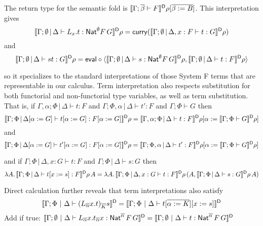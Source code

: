 \documentclass{lmcs}
\theoremstyle{plain}\newtheorem{satz}[thm]{Satz}
\begin{document}
{The return type for the semantic fold is
  $\llbracket{\Gamma;\overline{\beta} \vdash F}\rrbracket^{\mathsf D}\rho[\overline{\beta := B}]$.
This interpretation gives
\[\dsem{\Gamma;\emptyset \,|\, \Delta
  \vdash L_\empty x. t : \Nat^\emptyset F\, G}\rho = \curry
  (\dsem{\Gamma;\emptyset \,|\, \Delta, x : F \vdash t :
  G}\rho)\]
and
\[\llbracket{\Gamma;\emptyset \,|\, \Delta \vdash st:
    G}\rrbracket^{\mathsf D} \rho = \mathsf{eval} \circ \langle \llbracket{\Gamma;\emptyset \,|\, \Delta
  \vdash s: \mathsf{Nat}^\emptyset F\, G}\rrbracket^{\mathsf D}\rho, \llbracket{\Gamma;\emptyset \,|\, \Delta \vdash
  t: F}\rrbracket^{\mathsf D}\rho \rangle\]

\vspace*{0.05in}

\noindent
so it specializes to the standard interpretations of those System F
terms that are representable in our calculus.  Term interpretation
also respects substitution for both functorial and non-functorial type
variables, as well as term substitution. That is, if
$\Gamma,\alpha;\Phi \,|\, \Delta \vdash t : F$ and $\Gamma;\Phi,\alpha
\,|\, \Delta \vdash t' : F$ and $\Gamma;\Phi \vdash G$ then
\[\llbracket{\Gamma;\Phi \,|\, \Delta[\alpha := G] \vdash t[\alpha :=
    G] : F[\alpha := G]}\rrbracket^{\mathsf D}\rho = \llbracket{\Gamma,\alpha;\Phi \,|\, \Delta
  \vdash t : F }\rrbracket^{\mathsf D}\rho [ \alpha := \llbracket{\Gamma;\Phi\vdash G}\rrbracket^{\mathsf D}\rho ]\]
and
\[\llbracket{\Gamma;\Phi \,|\, \Delta[\alpha := G] \vdash t'[\alpha :=
    G] : F[\alpha := G]}\rrbracket^{\mathsf D}\rho = \llbracket{\Gamma;\Phi,\alpha \,|\, \Delta
  \vdash t' : F }\rrbracket^{\mathsf D}\rho [ \alpha := \llbracket{\Gamma;\Phi\vdash G}\rrbracket^{\mathsf D}\rho ]\]

\vspace*{0.05in}

\noindent
and if $\Gamma;\Phi \,|\, \Delta, x: G \vdash t : F$ and $\Gamma;\Phi
\,|\, \Delta \vdash s : G$ then
\[\lambda A.\, \llbracket{\Gamma;\Phi \,|\, \Delta \vdash t[x := s] :
  F }\rrbracket^{\mathsf D}\rho \, A = \lambda A.\,\llbracket{\Gamma;\Phi \,|\, \Delta, x: G
  \vdash t : F}\rrbracket^{\mathsf D}\rho \,(A, \llbracket{\Gamma;\Phi \,|\, \Delta\vdash s:
  G}\rrbracket^{\mathsf D}\rho\, A)\]

\vspace*{0.05in}

\noindent
Direct calculation further reveals that term interpretations also
satisfy
\[\llbracket{\Gamma; \Phi~|~\Delta \vdash
  (L_{\overline{\alpha}}x.t)_{\overline{K}}s}\rrbracket^{\mathsf D} = \llbracket{\Gamma; \Phi~|~\Delta \vdash
  t [\overline{\alpha := K}][x := s]}\rrbracket^{\mathsf D}\]
       {\color{red} Add if true:
$\llbracket{\Gamma; \emptyset~|~\Delta \vdash L_{\overline{\alpha}} x.t_{\overline{\alpha}} x :
   \mathsf{Nat}^{\overline{\alpha}}\, F\, G}\rrbracket^{\mathsf D} =  \llbracket{\Gamma; \emptyset~|~\Delta \vdash
   t : \mathsf{Nat}^{\overline{\alpha}}\, F\, G}\rrbracket^{\mathsf D}$}


}
\end{document}
